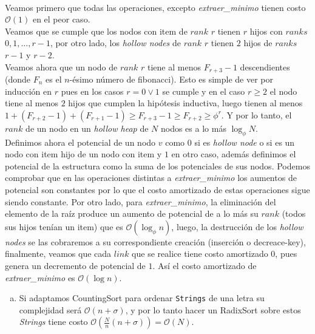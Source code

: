 \documentclass[dcc,uchile]{fcfmcourse}
\theoremstyle{plain}
\theoremstyle{definition}
\begin{document}
\begin{problems}
\\
Veamos primero que todas las operaciones, excepto \textit{extraer\_minimo} tienen costo $\mathcal{O}(1)$ en el peor caso.\\

Veamos que se cumple que los nodos con item de $rank$ $r$ tienen $r$ hijos con $ranks$ $0,1,\ldots, r-1$, por otro lado, los \textit{hollow nodes} de $rank$ $r$ tienen $2$ hijos de $ranks$ $r-1$ y $r-2$.\\

Veamos ahora que un nodo de $rank$ $r$ tiene al menos $F_{r+3}-1$ descendientes (donde $F_{n}$ es el $n$-ésimo número de fibonacci). Esto es simple de ver por inducción en $r$ pues en los casos $r = 0 \lor 1$ se cumple y en el caso $r\ge 2$ el nodo tiene al menos $2$ hijos que cumplen la hipótesis inductiva, luego tienen al menos $1 + (F_{r+2}-1) + (F_{r+1}-1) \ge F_{r+3}-1 \ge F_{r+2} \ge \phi^r$. Y por lo tanto, el $rank$ de un nodo en un \textit{hollow heap} de $N$ nodos es a lo más $\log_{\phi}{N}$.\\

Definimos ahora el potencial de un nodo $v$ como $0$ si es \textit{hollow node} o si es un nodo con item hijo de un nodo con item y $1$ en otro caso, además definimos el potencial de la estructura como la suma de los potenciales de sus nodos. Podemos comprobar que en las operaciones distintas a \textit{extraer\_minimo} los aumentos de potencial son constantes por lo que el costo amortizado de estas operaciones sigue siendo constante. Por otro lado, para \textit{extraer\_minimo}, la eliminación del elemento de la raíz produce un aumento de potencial de a lo más su $rank$ (todos sus hijos tenían un item) que es $\mathcal{O}(\log_{\phi}{n})$, luego, la destrucción de los \textit{hollow nodes} se las cobraremos a su correspondiente creación (inserción o decreace-key), finalmente, veamos que cada $link$ que se realice tiene costo amortizado $0$, pues genera un decremento de potencial de $1$. Así el costo amortizado de \textit{extraer\_minimo} es $\mathcal{O}(\log{n})$.
\\
\begin{enumerate}[a)]
    \item Si adaptamos CountingSort para ordenar \texttt{Strings} de una letra su complejidad será $\mathcal{O}(n + \sigma)$, y por lo tanto hacer un RadixSort sobre estos \textit{Strings} tiene costo $\mathcal{O}\left(\frac{N}{n} (n + \sigma)\right) = \mathcal{O}(N)$.\\
    

\end{enumerate}
\end{problems}
\end{document}
